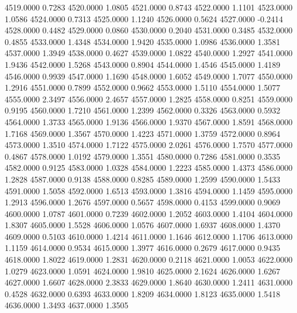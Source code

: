 4519.0000      0.7283
4520.0000      1.0805
4521.0000      0.8743
4522.0000      1.1101
4523.0000      1.0586
4524.0000      0.7313
4525.0000      1.1240
4526.0000      0.5624
4527.0000     -0.2414
4528.0000      0.4482
4529.0000      0.0860
4530.0000      0.2040
4531.0000      0.3485
4532.0000      0.4855
4533.0000      1.4348
4534.0000      1.9420
4535.0000      1.0986
4536.0000      1.3581
4537.0000      1.3949
4538.0000      0.4627
4539.0000      1.0822
4540.0000      1.2927
4541.0000      1.9436
4542.0000      1.5268
4543.0000      0.8904
4544.0000      1.4546
4545.0000      1.4189
4546.0000      0.9939
4547.0000      1.1690
4548.0000      1.6052
4549.0000      1.7077
4550.0000      1.2916
4551.0000      0.7899
4552.0000      0.9662
4553.0000      1.5110
4554.0000      1.5077
4555.0000      2.3497
4556.0000      2.4657
4557.0000      1.2825
4558.0000      0.8251
4559.0000      0.9195
4560.0000      1.7210
4561.0000      1.2399
4562.0000      0.3326
4563.0000      0.5932
4564.0000      1.3733
4565.0000      1.9136
4566.0000      1.9370
4567.0000      1.8591
4568.0000      1.7168
4569.0000      1.3567
4570.0000      1.4223
4571.0000      1.3759
4572.0000      0.8964
4573.0000      1.3510
4574.0000      1.7122
4575.0000      2.0261
4576.0000      1.7570
4577.0000      0.4867
4578.0000      1.0192
4579.0000      1.3551
4580.0000      0.7286
4581.0000      0.3535
4582.0000      0.9125
4583.0000      1.0328
4584.0000      1.2223
4585.0000      1.4373
4586.0000      1.2828
4587.0000      0.9138
4588.0000      0.8285
4589.0000      1.2599
4590.0000      1.5433
4591.0000      1.5058
4592.0000      1.6513
4593.0000      1.3816
4594.0000      1.1459
4595.0000      1.2913
4596.0000      1.2676
4597.0000      0.5657
4598.0000      0.4153
4599.0000      0.9069
4600.0000      1.0787
4601.0000      0.7239
4602.0000      1.2052
4603.0000      1.4104
4604.0000      1.8307
4605.0000      1.5528
4606.0000      1.0576
4607.0000      1.6937
4608.0000      1.4370
4609.0000      0.5103
4610.0000      1.4214
4611.0000      1.1646
4612.0000      1.1706
4613.0000      1.1159
4614.0000      0.9534
4615.0000      1.3977
4616.0000      0.2679
4617.0000      0.9435
4618.0000      1.8022
4619.0000      1.2831
4620.0000      0.2118
4621.0000      1.0053
4622.0000      1.0279
4623.0000      1.0591
4624.0000      1.9810
4625.0000      2.1624
4626.0000      1.6267
4627.0000      1.6607
4628.0000      2.3833
4629.0000      1.8640
4630.0000      1.2411
4631.0000      0.4528
4632.0000      0.6393
4633.0000      1.8209
4634.0000      1.8123
4635.0000      1.5418
4636.0000      1.3493
4637.0000      1.3505
